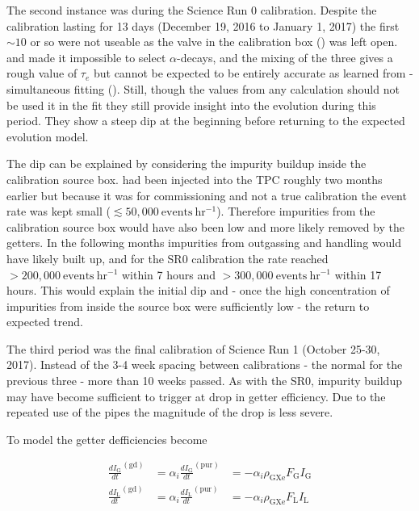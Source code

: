 The second instance was during the Science Run 0 \rncal calibration.  Despite the calibration lasting for 13 days (December 19, 2016 to
January 1, 2017) the first ${\sim} 10$ or
so were not useable as the valve in the calibration box () was left
open.  \rncal and  made it impossible to select  $\alpha$-decays, and the mixing of the three gives a rough
value of $\tau_e$ but cannot be expected to be entirely accurate as learned from \rnbkg- simultaneous fitting
().  Still, though the values from any calculation should not be used it in the
fit they still provide insight into the evolution during this period.  They show a steep dip at the beginning before returning to the
expected evolution model.

The dip can be explained by considering the impurity buildup inside the calibration source box.  \rncal had been injected into the TPC
roughly two months earlier but because it was for commissioning and not a true calibration the event rate was kept small
($\lesssim 50,000\ \mathrm{events\ hr^{-1}}$).  Therefore
impurities from the calibration source box would have also been low and more likely removed by the getters.  In the following months
impurities from outgassing and handling would have likely built up, and for the SR0 calibration the rate reached
$> 200,000\ \mathrm{events\ hr^{-1}}$ within 7 hours and $> 300,000\ \mathrm{events\ hr^{-1}}$ within 17 hours.  This would explain the
initial dip and - once the high concentration of impurities from inside the source box were sufficiently low - the return to expected
trend.

The third period was the final \rncal calibration of Science Run 1 (October 25-30, 2017).  Instead of the 3-4 week spacing between
calibrations - the normal for the previous three - more than 10 weeks passed.  As with the SR0, impurity buildup may have become
sufficient to trigger at drop in getter efficiency.  Due to the repeated use of the pipes the magnitude of the drop is less severe.

To model the getter defficiencies 
become

\begin{equation}
\begin{aligned}
\frac{dI_{\mathrm{G}}}{dt}^{(\mathrm{gd})} &= \alpha_i \frac{dI_{\mathrm{G}}}{dt}^{(\mathrm{pur})} &=
-\alpha_i \rho_{\mathrm{GXe}} F_{\mathrm{G}} I_{\mathrm{G}}
\label{eq:electron_lifetime_model_detector_effects_getter_gxe}
\\
\frac{dI_{\mathrm{L}}}{dt}^{(\mathrm{gd})} &= \alpha_i \frac{dI_{\mathrm{L}}}{dt}^{(\mathrm{pur})} &=
-\alpha_i \rho_{\mathrm{GXe}} F_{\mathrm{L}} I_{\mathrm{L}}
\label{eq:electron_lifetime_model_detector_effects_getter_lxe}
\end{aligned}
\end{equation}

